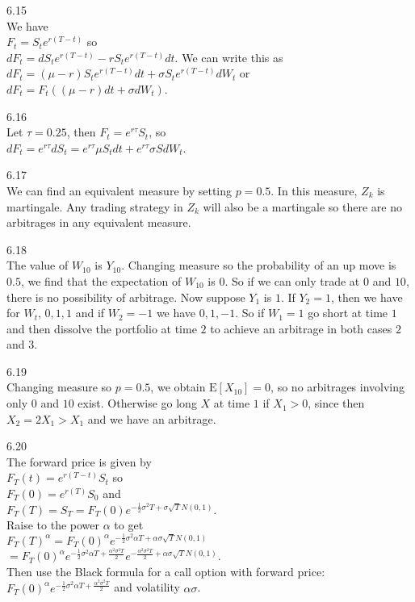 6.15 \\
We have \\
$F_t = S_t e^{r(T-t)}$ so \\
$dF_t = dS_t e^{r(T-t)} - rS_t e^{r(T-t)} dt$.
We can write this as \\
$dF_t = (\mu -r)S_t e^{r(T-t)} dt+ \sigma S_t e^{r(T-t)} dW_t$ or \\
$dF_t = F_t ((\mu - r)dt + \sigma dW_t)$.

6.16 \\
Let $\tau = 0.25$, then $F_t = e^{r \tau} S_t$, so \\
$dF_t = e^{r \tau}dS_t = e^{r \tau} \mu S_t dt + e^{r \tau} \sigma S dW_t$.

6.17 \\
We can find an equivalent measure by setting $p=0.5$. In this measure, $Z_k$ is martingale. Any trading strategy in $Z_k$ will also be a martingale so there are no arbitrages in any equivalent measure.

6.18 \\
The value of $W_{10}$ is $Y_{10}$. Changing measure so the probability of an up move is $0.5$, we find that the expectation of $W_{10}$ is $0$. So if we can only trade at $0$ and $10$, there is no possibility of arbitrage. Now suppose $Y_1$ is $1$. If $Y_2 = 1$, then we have for $W_t$, $0,1,1$ and if $W_2 = -1$ we have $0,1,-1$. So if $W_1=1$ go short at time $1$ and then dissolve the portfolio at time $2$ to achieve an arbitrage in both cases $2$ and $3$.

6.19 \\
Changing measure so $p=0.5$, we obtain $\text{E}[X_{10}]=0$, so no arbitrages involving only $0$ and $10$ exist. Otherwise go long $X$ at time $1$ if $X_1 > 0$, since then $X_2 = 2 X_1 > X_1$ and we have an arbitrage.

6.20 \\
The forward price is given by \\
$F_T (t) = e^{r(T-t)} S_t$ so \\
$F_T (0)=e^{r(T)} S_0$ and \\
$F_T (T) = S_T = F_T (0) e^{-\frac{1}{2} \sigma^2 T + \sigma \sqrt{T} N(0,1)}$. \\
Raise to the power $\alpha$ to get \\
$F_T (T)^{\alpha} = F_T (0)^{\alpha} e^{-\frac{1}{2} \sigma^2 \alpha T + \alpha \sigma \sqrt{T} N(0,1)}$ \\
$=F_T (0)^{\alpha} e^{-\frac{1}{2}\sigma^2 \alpha T + \frac{\alpha^2 \sigma^2 T}{2}} e^{-\frac{\alpha^2 \sigma^2 T}{2} + \alpha \sigma \sqrt{T} N(0,1)}$. \\
Then use the Black formula for a call option with forward price: \\
$F_T (0)^{\alpha} e^{-\frac{1}{2} \sigma^2 \alpha T + \frac{\alpha^2 \sigma^2 T}{2}}$ and volatility $\alpha \sigma$.

